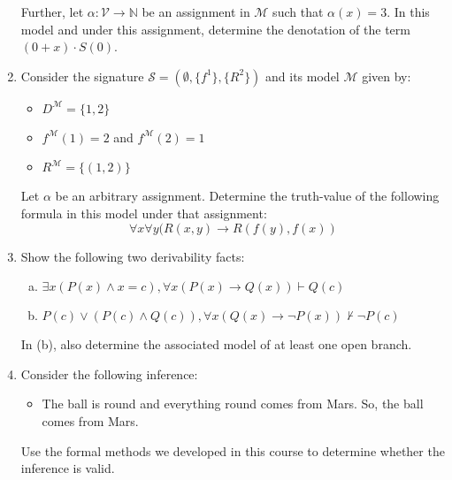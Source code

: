\begin{enumerate}[\thesection.1]
\begin{itemize}
    \end{itemize}
    Further, let $\alpha:\mathcal{V}\to\mathbb{N}$ be an assignment in
    $\mathcal{M}$ such that $\alpha(x)=3$. In this model and under
    this assignment, determine the denotation of the term $(0+x)\cdot S(0)$.

  \item Consider the signature $\mathcal{S}=(\emptyset, \{f^1\},
    \{R^2\})$ and its model $\mathcal{M}$ given by:
    \begin{itemize}

    \item $D^\mathcal{M}=\{1,2\}$
      
    \item $f^\mathcal{M}(1)=2$ and $f^\mathcal{M}(2)=1$

    \item $R^\mathcal{M}=\{(1,2)\}$
      
     \end{itemize}

     Let $\alpha$ be an arbitrary assignment. Determine the
     truth-value of the following formula in this model under that
     assignment: \[\forall x\forall y(R(x,y)\to R(f(y), f(x))\] 

   \item Show the following two derivability facts:
     
     \begin{enumerate}[(a)]

     \item $\exists x(P(x)\land x=c), \forall x(P(x)\to Q(x))\vdash Q(c)$
       
       \item $P(c)\lor (P(c)\land Q(c)), \forall x(Q(x)\to \neg
         P(x))\nvdash \neg P(c)$
         
       \end{enumerate}
      
       In (b), also determine the associated model of at least one
       open branch.


     \item Consider the following inference:
       \begin{itemize}
       \item The ball is round and everything round comes from
         Mars. So, the ball comes from Mars.
       \end{itemize}
       Use the formal methods we developed in this course to determine
       whether the inference is valid.

    
  \end{enumerate}


